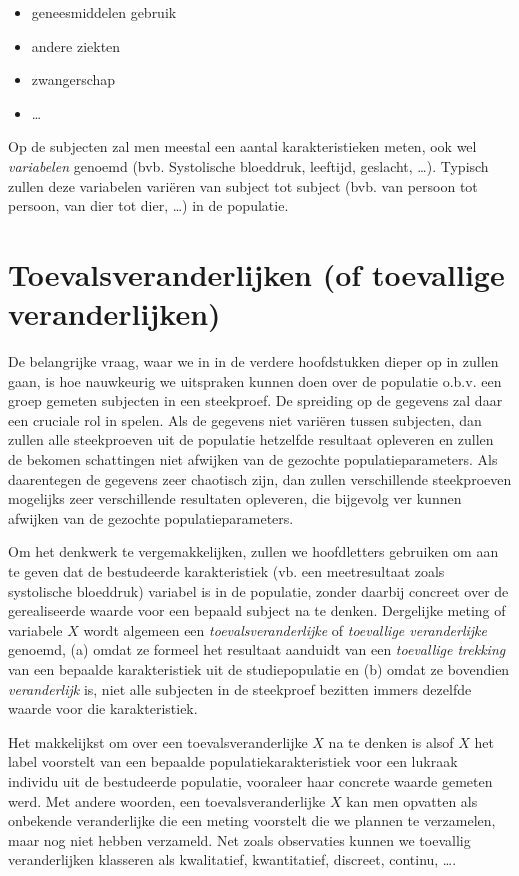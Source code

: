\documentclass[
  12pt,dutch]{book}
\providecommand{\tightlist}{%
  \setlength{\itemsep}{0pt}\setlength{\parskip}{0pt}}
\theoremstyle{definition}
\theoremstyle{definition}
\theoremstyle{definition}
\theoremstyle{definition}
\theoremstyle{remark}
\begin{document}
\begin{itemize}
\tightlist
\item
  geneesmiddelen gebruik
\item
  andere ziekten
\item
  zwangerschap
\item
  \ldots{}
\end{itemize}

Op de subjecten zal men meestal een aantal karakteristieken meten, ook wel \emph{variabelen} genoemd (bvb. Systolische bloeddruk, leeftijd, geslacht, \ldots). Typisch zullen deze variabelen variëren van subject tot subject (bvb. van persoon tot persoon, van dier tot dier, \ldots) in de populatie.

\section{Toevalsveranderlijken (of toevallige veranderlijken)}\label{toevalsveranderlijken-of-toevallige-veranderlijken}

De belangrijke vraag, waar we in in de verdere hoofdstukken dieper op in
zullen gaan, is hoe nauwkeurig we uitspraken kunnen doen over de populatie o.b.v. een groep gemeten subjecten in een steekproef.
De spreiding op de gegevens zal daar een cruciale rol in spelen.
Als de gegevens niet variëren tussen subjecten, dan zullen alle steekproeven uit de populatie hetzelfde resultaat opleveren en zullen de bekomen schattingen niet afwijken van de gezochte populatieparameters.
Als daarentegen de gegevens zeer chaotisch zijn, dan zullen verschillende steekproeven mogelijks zeer verschillende resultaten opleveren, die bijgevolg ver kunnen afwijken van de gezochte populatieparameters.

Om het denkwerk te vergemakkelijken, zullen we hoofdletters gebruiken om aan te geven dat
de bestudeerde karakteristiek (vb. een meetresultaat zoals systolische bloeddruk) variabel is in de populatie,
zonder daarbij concreet over de gerealiseerde waarde
voor een bepaald subject na te denken.
Dergelijke meting of variabele \(X\) wordt
algemeen een \emph{toevalsveranderlijke} of \emph{toevallige veranderlijke} genoemd, (a) omdat ze formeel het
resultaat aanduidt van een \emph{toevallige trekking} van een bepaalde
karakteristiek uit de studiepopulatie en (b) omdat ze bovendien \emph{veranderlijk} is,
niet alle subjecten in de steekproef bezitten immers dezelfde waarde
voor die karakteristiek.

Het makkelijkst om over een toevalsveranderlijke \(X\) na te denken is alsof \(X\) het label voorstelt van
een bepaalde populatiekarakteristiek voor een lukraak individu uit de
bestudeerde populatie, vooraleer haar concrete waarde gemeten werd.
Met andere woorden, een toevalsveranderlijke \(X\) kan men opvatten als onbekende veranderlijke die een meting voorstelt die we plannen te verzamelen, maar nog niet hebben verzameld.
Net zoals observaties kunnen we toevallig veranderlijken klasseren als kwalitatief, kwantitatief, discreet, continu, \ldots.
\end{document}
